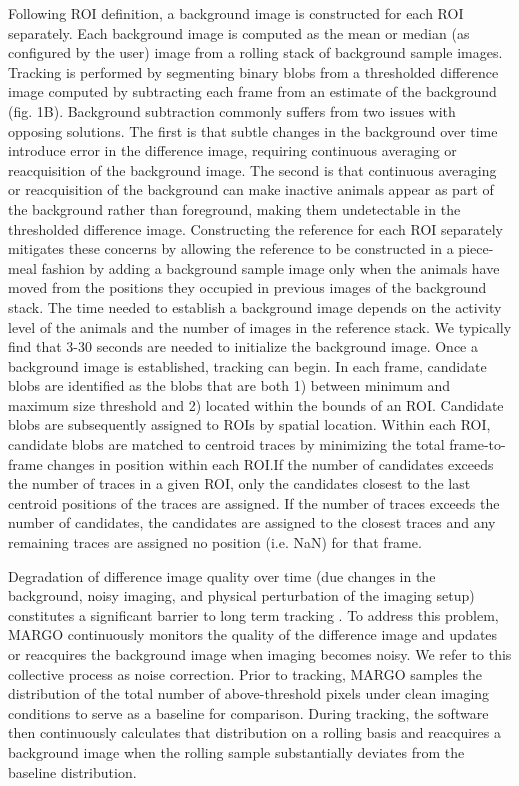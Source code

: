 \documentclass[10pt,letterpaper]{article}
\begin{document}
Following ROI definition, a background image is constructed for each ROI separately. Each background image is computed as the mean or median (as configured by the user) image from a rolling stack of background sample images. Tracking is performed by segmenting binary blobs from a thresholded difference image computed by subtracting each frame from an estimate of the background (fig. 1B). Background subtraction commonly suffers from two issues with opposing solutions. The first is that subtle changes in the background over time introduce error in the difference image, requiring continuous averaging or reacquisition of the background image. The second is that continuous averaging or reacquisition of the background can make inactive animals appear as part of the background rather than foreground, making them undetectable in the thresholded difference image. Constructing the reference for each ROI separately mitigates these concerns by allowing the reference to be constructed in a piece-meal fashion by adding a background sample image only when the animals have moved from the positions they occupied in previous images of the background stack. The time needed to establish a background image depends on the activity level of the animals and the number of images in the reference stack. We typically find that 3-30 seconds are needed to initialize the background image. Once a background image is established, tracking can begin. In each frame, candidate blobs are identified as the blobs that are both 1) between minimum and maximum size threshold and 2) located within the bounds of an ROI. Candidate blobs are subsequently assigned to ROIs by spatial location. Within each ROI, candidate blobs are matched to centroid traces by minimizing the total frame-to-frame changes in position within each ROI.If the number of candidates exceeds the number of traces in a given ROI, only the candidates closest to the last centroid positions of the traces are assigned. If the number of traces exceeds the number of candidates, the candidates are assigned to the closest traces and any remaining traces are assigned no position (i.e. NaN) for that frame.

Degradation of difference image quality over time (due changes in the background, noisy imaging, and physical perturbation of the imaging setup) constitutes a significant barrier to long term tracking \cite{Sridhar_2019}. To address this problem, MARGO continuously monitors the quality of the difference image and updates or reacquires the background image when imaging becomes noisy. We refer to this collective process as noise correction. Prior to tracking, MARGO samples the distribution of the total number of above-threshold pixels under clean imaging conditions to serve as a baseline for comparison. During tracking, the software then continuously calculates that distribution on a rolling basis and reacquires a background image when the rolling sample substantially deviates from the baseline distribution.
\end{document}

